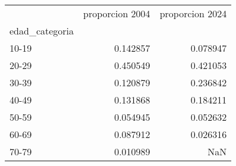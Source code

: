 \begin{tabular}{lrr}
\toprule
 & proporcion 2004 & proporcion 2024 \\
edad_categoria &  &  \\
\midrule
10-19 & 0.142857 & 0.078947 \\
20-29 & 0.450549 & 0.421053 \\
30-39 & 0.120879 & 0.236842 \\
40-49 & 0.131868 & 0.184211 \\
50-59 & 0.054945 & 0.052632 \\
60-69 & 0.087912 & 0.026316 \\
70-79 & 0.010989 & NaN \\
\bottomrule
\end{tabular}
